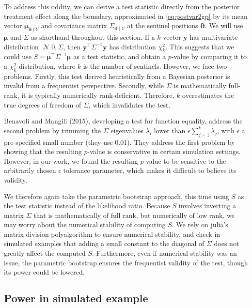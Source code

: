 \documentclass[letter]{article}
\DeclareMathOperator{\normal}{\mathcal{N}}
\newcommand{\trans}{^{\intercal}}
\newcommand{\yvec}{\mathbold{y}}
\newcommand{\muvec}{\mathbold{\mu}}
\newcommand{\boundary}{\partial}
\newcommand{\sentinels}{\bm{\boundary}}
\begin{document}
To address this oddity, we can derive a test statistic directly from the
posterior treatment effect along the boundary, approximated in
\eqref{eq:postvar2gp} by its mean vector \(\muvec_{\sentinels \mid Y}\)
and covariance matrix \(\Sigma_{\sentinels \mid Y}\) at the sentinel
positions \(\sentinels\). We will use \(\muvec\) and \(\Sigma\) as
shorthand throughout this section. If a \(k\)-vector \(\yvec\) has
multivariate distribution \(\normal{0, \Sigma}\), then
\(\yvec\trans \Sigma^{-1} \yvec\) has distribution \(\chi^2_k\). This
suggests that we could use \(S=\muvec\trans \Sigma^{-1} \muvec\) as a
test statistic, and obtain a \(p\)-value by comparing it to a
\(\chi^2_k\) distribution, where \(k\) is the number of sentinels.
However, we face two problems. Firstly, this test derived heuristically
from a Bayesian posterior is invalid from a frequentist perspective.
Secondly, while \(\Sigma\) is mathematically full-rank, it is typically
numerically rank-deficient. Therefore, \(k\) overestimates the true
degrees of freedom of \(\Sigma\), which invalidates the test.

Benavoli and Mangili (2015), developing a test for function equality,
address the second problem by trimming the \(\Sigma\) eigenvalues
\(\lambda_i\) lower than \(\epsilon \sum_{j=1}^k \lambda_j\), with
\(\epsilon\) a pre-specified small number (they use 0.01). They address
the first problem by showing that the resulting \(p\)-value is
conservative in certain simulation settings. However, in our work, we
found the resulting \(p\)-value to be sensitive to the arbitrarily
chosen \(\epsilon\) tolerance parameter, which makes it difficult to
believe its validity.

We therefore again take the parametric bootstrap approach, this time
using \(S\) as the test statistic instead of the likelihood ratio.
Because \(S\) involves inverting a matrix \(\Sigma\) that is
mathematically of full rank, but numerically of low rank, we may worry
about the numerical stability of computing \(S\). We rely on julia's
matrix division polyalgorithm to ensure numerical stability, and check
in simulated examples that adding a small constant to the diagonal of
\(\Sigma\) does not greatly affect the computed \(S\). Furthermore, even
if numerical stability was an issue, the parametric bootstrap ensures
the frequentist validity of the test, though its power could be lowered.
    


    	\subsection{Power in simulated
example}\label{power-in-simulated-example}
\end{document}
